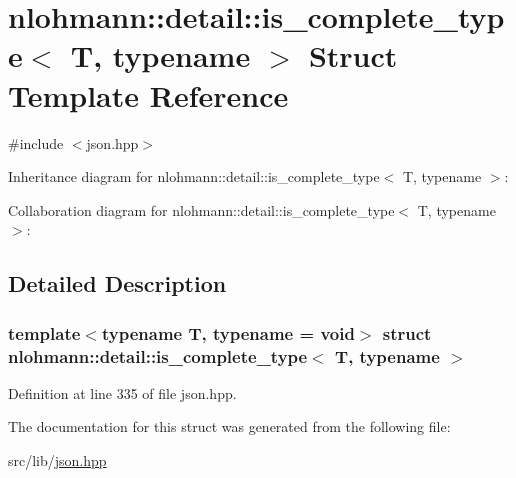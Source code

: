 \hypertarget{structnlohmann_1_1detail_1_1is__complete__type}{}\section{nlohmann\+:\+:detail\+:\+:is\+\_\+complete\+\_\+type$<$ T, typename $>$ Struct Template Reference}
\label{structnlohmann_1_1detail_1_1is__complete__type}


{\ttfamily \#include $<$json.\+hpp$>$}



Inheritance diagram for nlohmann\+:\+:detail\+:\+:is\+\_\+complete\+\_\+type$<$ T, typename $>$\+:


Collaboration diagram for nlohmann\+:\+:detail\+:\+:is\+\_\+complete\+\_\+type$<$ T, typename $>$\+:


\subsection{Detailed Description}
\subsubsection*{template$<$typename T, typename = void$>$\newline
struct nlohmann\+::detail\+::is\+\_\+complete\+\_\+type$<$ T, typename $>$}



Definition at line 335 of file json.\+hpp.



The documentation for this struct was generated from the following file\+:\begin{DoxyCompactItemize}
\item 
src/lib/\hyperlink{json_8hpp}{json.\+hpp}\end{DoxyCompactItemize}
